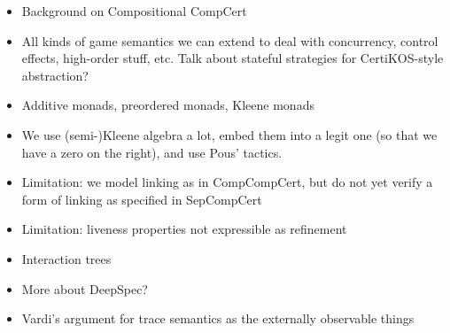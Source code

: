 \documentclass[acmsmall,timestamp,review,anonymous]{acmart}
\begin{document}
\begin{itemize}
\item Background on Compositional CompCert
\item All kinds of game semantics we can extend to deal with
  concurrency, control effects, high-order stuff, etc.
  Talk about stateful strategies for CertiKOS-style abstraction?
\item
  Additive monads, preordered monads, Kleene monads
\item
  We use (semi-)Kleene algebra a lot,
  embed them into a legit one (so that we have a zero on the right),
  and use Pous' tactics.
\item
  Limitation:
  we model linking as in CompCompCert,
  but do not yet verify a form of linking as specified in SepCompCert
\item
  Limitation:
  liveness properties not expressible as refinement
\item
  Interaction trees
\item
  More about DeepSpec?
\item
  Vardi's argument for trace semantics
  as the externally observable things
\end{itemize}




\end{document}
